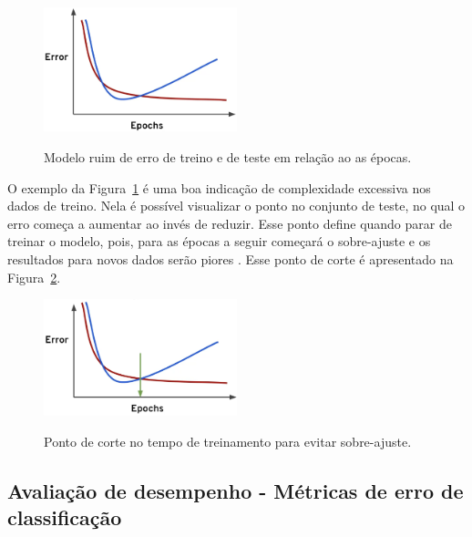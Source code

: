             \begin{figure}[H]
                \centering
                \caption{Modelo ruim de erro de treino e de teste em relação ao as épocas.}
                \includegraphics[width=0.5\textwidth]{fig/2-fundamentacao/overfitting/Epoca_teste_ruim.png}
                \label{fig:Epoca_teste_ruim}
            \end{figure}
            
            O exemplo da Figura~\ref{fig:Epoca_teste_ruim} é uma boa indicação de complexidade excessiva nos dados de treino. Nela é possível visualizar o ponto no conjunto de teste, no qual o erro começa a aumentar ao invés de reduzir. Esse ponto define quando parar de treinar o modelo, pois, para as épocas a seguir começará o sobre-ajuste e os resultados para novos dados serão piores \cite{CollegeL30:online}. Esse ponto de corte é apresentado na Figura~\ref{fig:ponto_de_corte}.
            
            \begin{figure}[H]
                \centering
                \caption{Ponto de corte no tempo de treinamento para evitar sobre-ajuste.}
                \includegraphics[width=0.5\textwidth]{fig/2-fundamentacao/overfitting/ponto_de_corte.png}
                \label{fig:ponto_de_corte}
            \end{figure}
            
        \subsection{Avaliação de desempenho - Métricas de erro de classificação}\label{cap:metrica}
            
